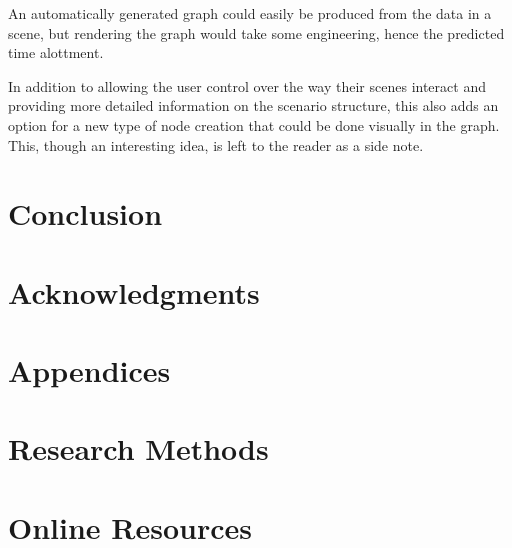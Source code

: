 \documentclass[sigconf]{acmart}
\begin{document}
An automatically generated graph could easily be produced from the data in a scene, but rendering the graph would take some engineering, hence the predicted time alottment.

In addition to allowing the user control over the way their scenes interact and providing more detailed information on the scenario structure, this also adds an option for a new type of node creation that could be done visually in the graph. This, though an interesting idea, is left to the reader as a side note.

\section{Conclusion}
	\lipsum[2-2]

\section{Acknowledgments}
	\lipsum[2-2]




\section*{Appendices}
\appendix

\section{Research Methods}
	\lipsum[2-2]

\section{Online Resources}
	\lipsum[2-2]
\end{document}
